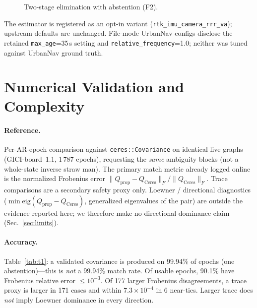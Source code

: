 \documentclass[letterpaper, journal, twocolumn]{IEEEtran}
\begin{document}
\begin{figure}[!t]
\centering
{}
\caption{Two-stage elimination with abstention (F2).}
\label{fig:schur}
\end{figure}

The estimator is registered as an opt-in variant
(\texttt{rtk\_imu\_camera\_rrr\_va}); upstream defaults are unchanged.
File-mode UrbanNav configs disclose the retained \texttt{max\_age}=35\,s
setting and \texttt{relative\_frequency}=1.0; neither was
tuned against UrbanNav ground truth.

\section{Numerical Validation and Complexity}
\label{sec:numeric}

\paragraph{Reference.}
Per-AR-epoch comparison against \texttt{ceres::Covariance} on identical live
graphs (GICI-board~1.1, 1\,787 epochs), requesting the \emph{same} ambiguity
blocks (not a whole-state inverse straw man).
The primary match metric already logged online is the normalized Frobenius
error $\|Q_{\mathrm{prop}}-Q_{\mathrm{Ceres}}\|_F/\|Q_{\mathrm{Ceres}}\|_F$.
Trace comparisons are a secondary safety proxy only.
Loewner / directional diagnostics
($\min\mathrm{eig}(Q_{\mathrm{prop}}-Q_{\mathrm{Ceres}})$, generalized
eigenvalues of the pair) are outside the evidence reported here; we therefore
make no directional-dominance claim (Sec.~\ref{sec:limits}).

\paragraph{Accuracy.}
Table~\ref{tab:t1}: a validated covariance is produced on 99.94\% of epochs
(one abstention)---this is \emph{not} a 99.94\% match rate.
Of usable epochs, 90.1\% have Frobenius relative error $\le10^{-3}$.
Of 177 larger Frobenius disagreements, a trace proxy is larger in 171 cases
and within $7.3\times10^{-4}$ in 6 near-ties.
Larger trace does \emph{not} imply Loewner dominance in every direction.
\end{document}
